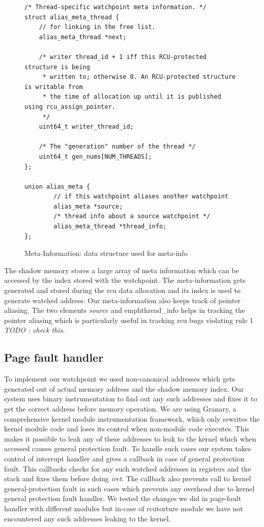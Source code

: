 \begin{figure}[h]
\begin{lstlisting}
/* Thread-specific watchpoint meta information. */
struct alias_meta_thread {
    // for linking in the free list.
    alias_meta_thread *next;

    /* writer thread_id + 1 iff this RCU-protected structure is being
     * written to; otherwise 0. An RCU-protected structure is writable from
     * the time of allocation up until it is published using rcu_assign_pointer.
     */
    uint64_t writer_thread_id;

    /* The "generation" number of the thread */
    uint64_t gen_nums[NUM_THREADS];
};

union alias_meta {
        // if this watchpoint aliases another watchpoint
        alias_meta *source;
        /* thread info about a source watchpoint */
        alias_meta_thread *thread_info;
}; 
\end{lstlisting}
\caption{Meta-Information: data structure used for meta-info}\label{fig:metainfo}
\end{figure}

The shadow memory stores a large array of meta information which can be accessed by the index stored with the watchpoint. The meta-information gets generated and stored during the rcu data allocation and its index is used to generate watched address. Our meta-information also keeps track of pointer aliasing. The two elements \emph{source} and emph{thread\_info} helps in tracking the pointer aliasing which is particularly useful in tracking rcu bugs violating rule 1 \emph{TODO : check this}. 


\subsection{Page fault handler}
To implement our watchpoint we used non-canonical addresses which gets generated out of actual memory address and the shadow memory index. Our system uses binary instrumentation to find out any such addresses and fixes it to get the correct address before memory operation. We are using Granary, a comprehensive kernel module instrumentation framework, which only rewrites the kernel module code and loses its control when non-module code executes. This makes it possible to leak any of these addresses to leak to the kernel which when accessed causes general protection fault. To handle such cases our system takes control of interrupt handler and gives a callback in case of general protection fault. This callbacks checks for any such watched addresses in registers and the stack and fixes them before doing \emph{iret}. The callback also prevents call to kernel general-protection fault in such cases which prevents any overhead due to kernel general protection fault handler. We tested the changes we did in page-fault handler with different modules but in-case of rcutorture module we have not encountered any such addresses leaking to the kernel.

